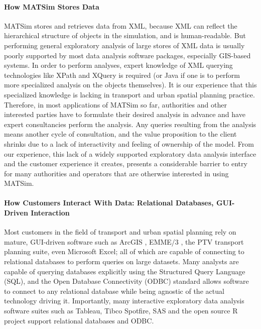\paragraph{How MATSim Stores Data}
MATSim stores and retrieves data from XML, because XML can reflect the hierarchical structure of objects in the simulation, and is human-readable. But performing general exploratory analysis of large stores of XML data is usually poorly supported by most data analysis software packages, especially GIS-based systems. In order to perform analyses, expert knowledge of XML querying technologies like XPath and XQuery is required (or Java if one is to perform more specialized analysis on the objects themselves). It is our experience that this specialized knowledge is lacking in transport and urban spatial planning practice. Therefore, in most applications of MATSim so far, authorities and other interested parties have to formulate their desired analysis in advance and have expert consultancies perform the analysis. Any queries resulting from the analysis means another cycle of consultation, and the value proposition to the client shrinks due to a lack of interactivity and feeling of ownership of the model. From our experience, this lack of a widely supported exploratory data analysis interface and the customer experience it creates, presents a considerable barrier to entry for many authorities and operators that are otherwise interested in using MATSim.

\paragraph{How Customers Interact With Data: Relational Databases, GUI-Driven Interaction}
Most customers in the field of transport and urban spatial planning rely on mature, GUI-driven software such as ArcGIS \citep{ARC_GIS_2011}, EMME/3 \citep{EMME_Webpage_2015}, the PTV \citep{PTV_Webpage_2009} transport planning suite, even Microsoft Excel; all of which are capable of connecting to relational databases to perform queries on large datasets. Many analysts are capable of querying databases explicitly using the Structured Query Language (SQL), and the Open Database Connectivity (ODBC) standard allows software to connect to any relational database while being agnostic of the actual technology driving it. Importantly, many interactive exploratory data analysis software suites such as Tableau, Tibco Spotfire,  SAS and the open source R project support relational databases and ODBC.

